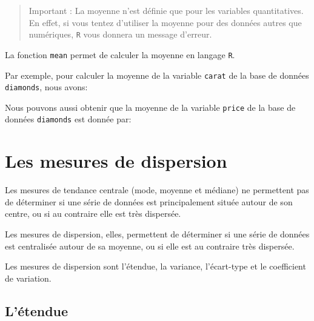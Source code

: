 \documentclass[]{book}
\newenvironment{Shaded}{\begin{snugshade}}{\end{snugshade}}
\newcommand{\KeywordTok}[1]{\textcolor[rgb]{0.13,0.29,0.53}{\textbf{#1}}}
\newcommand{\NormalTok}[1]{#1}
\newcommand{\OperatorTok}[1]{\textcolor[rgb]{0.81,0.36,0.00}{\textbf{#1}}}
\theoremstyle{definition}
\theoremstyle{definition}
\theoremstyle{definition}
\theoremstyle{remark}
\begin{document}
\begin{quote}
Important : La moyenne n'est définie que pour les variables
quantitatives. En effet, si vous tentez d'utiliser la moyenne pour des
données autres que numériques, \texttt{R} vous donnera un message
d'erreur.
\end{quote}

La fonction \texttt{mean} permet de calculer la moyenne en langage
\texttt{R}.

Par exemple, pour calculer la moyenne de la variable \texttt{carat} de
la base de données \texttt{diamonds}, nous avons:

\begin{Shaded}
\end{Shaded}

Nous pouvons aussi obtenir que la moyenne de la variable \texttt{price}
de la base de données \texttt{diamonds} est donnée par:

\begin{Shaded}
\end{Shaded}

\hypertarget{les-mesures-de-dispersion}{%
\section{Les mesures de dispersion}\label{les-mesures-de-dispersion}}

Les mesures de tendance centrale (mode, moyenne et médiane) ne
permettent pas de déterminer si une série de données est principalement
située autour de son centre, ou si au contraire elle est très dispersée.

Les mesures de dispersion, elles, permettent de déterminer si une série
de données est centralisée autour de sa moyenne, ou si elle est au
contraire très dispersée.

Les mesures de dispersion sont l'étendue, la variance, l'écart-type et
le coefficient de variation.

\hypertarget{letendue}{%
\subsection{L'étendue}\label{letendue}}
\end{document}
